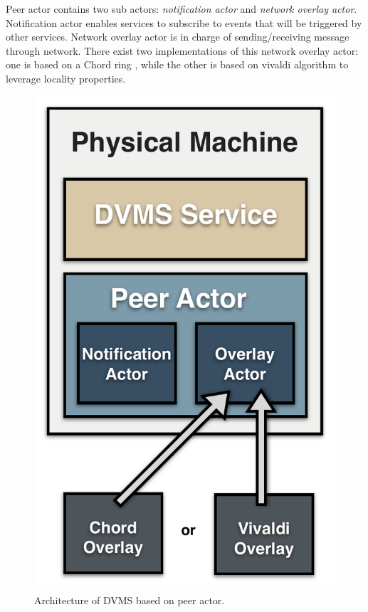 Peer actor contains two sub actors: \emph{notification actor} and \emph{network
overlay actor}. Notification actor enables services to subscribe to events that
will be triggered by other services. Network overlay actor is in charge of 
sending/receiving message through network. There exist two implementations of 
this network overlay actor: one is based on a Chord ring \cite{stoica2001chord},
while the other is based on vivaldi algorithm to leverage locality properties.

\begin{figure}[h!]
  \centering
  \includegraphics[width=0.5\linewidth]{Figures/DVMS.pdf}
  \caption{Architecture of DVMS based on peer actor.}%
  \label{fig:isp}%
\end{figure}

